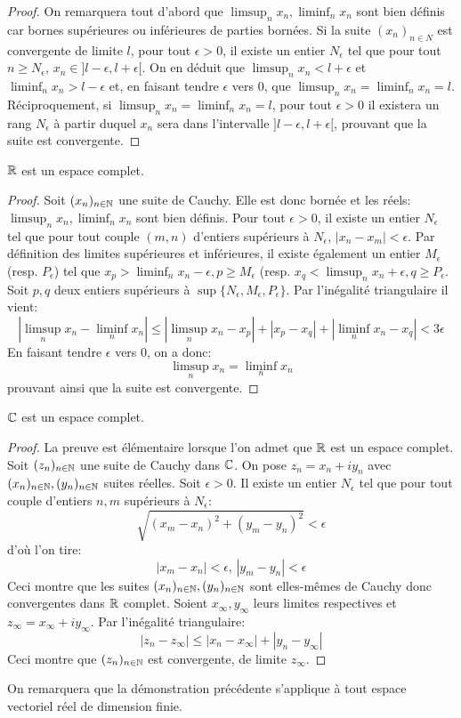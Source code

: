 \begin{proof}
On remarquera tout d'abord que $\limsup_n  x_n, \liminf_n x_n$ sont bien définis car bornes supérieures ou inférieures de parties bornées. Si la suite $(x_n)_{n \in N}$ est convergente de limite $l$, pour tout $\epsilon > 0$, il existe un entier $N_\epsilon$ tel que pour tout $n \geq N_\epsilon$, $x_n \in ]l-\epsilon, l+ \epsilon[$. On en déduit que $\limsup_n x_n < l+ \epsilon$ et $\liminf_n x_n > l- \epsilon$ et, en faisant tendre $\epsilon$ vers 0, que $\limsup_n x_n = \liminf_n x_n= l$. Réciproquement, si $\limsup_n x_n = \liminf_n x_n= l$, pour tout $\epsilon > 0$ il existera un rang $N_\epsilon$ à partir duquel $x_n$ sera dans l'intervalle $]l-\epsilon, l+\epsilon[$, prouvant que la suite est convergente. 
\end{proof}
\begin{fprop}
$\mathbb R$ est un espace complet.
\end{fprop}
\begin{proof}
Soit $(x_n)_{n \in {\mathbb N}}$ une suite de Cauchy. Elle est donc bornée et les réels:  $\limsup_n  x_n, \liminf_n x_n$ sont bien définis. Pour tout $\epsilon > 0$, il existe un entier $N_\epsilon$ tel que pour tout couple $(m,n)$ d'entiers supérieurs à $N_\epsilon$, $|x_n-x_m| < \epsilon$. Par définition des limites supérieures et inférieures, il existe également un entier $M_\epsilon$ (resp. $P_\epsilon$) tel que $x_p > \liminf_n x_n - \epsilon, p \geq M_\epsilon$ (resp. $x_q < \limsup_n x_n +  \epsilon, q \geq P_\epsilon$. Soit $p,q$ deux entiers supérieurs à $\sup \{ N_\epsilon, M_\epsilon, P_\epsilon\}$. Par l'inégalité triangulaire il vient:
\[
\left |\limsup_n x_n - \liminf_n x_n \right | \leq 
\left| \limsup_n x_n - x_p\right | + \left| x_p - x_q\right | + 
\left| \liminf_n x_n - x_q\right |  < 3 \epsilon
\]
En faisant tendre $\epsilon$ vers 0, on a donc:
\[
\limsup_n x_n = \liminf_n x_n 
\]
prouvant ainsi que la suite est convergente. 
\end{proof}
\begin{fprop}
	$\mathbb{C}$ est un espace complet.
\end{fprop}
\begin{proof}
	La preuve est élémentaire lorsque l'on admet que $\mathbb R$ est un espace complet. Soit $(z_n)_{n \in {\mathbb N}}$ une suite de Cauchy dans $\mathbb{C}$. On pose $z_n = x_n + i y_n$ avec $(x_n)_{n \in {\mathbb N}},(y_n)_{n \in {\mathbb N}}$ suites réelles. Soit $\epsilon > 0$. Il existe un entier $N_\epsilon$ tel que pour tout couple d'entiers $n,m$ supérieurs à $N_\epsilon$:
	\[
	\sqrt{(x_m-x_n)^2+(y_m-y_n)^2} < \epsilon
	\]
	d'où l'on tire:
	\[
	|x_m-x_n|<\epsilon, \, |y_m-y_n| < \epsilon
	\]
	Ceci montre que les suites $(x_n)_{n \in {\mathbb N}},(y_n)_{n \in {\mathbb N}}$ sont elles-mêmes de Cauchy donc convergentes dans $\mathbb R$ complet. Soient $x_\infty,y_\infty$ leurs limites respectives et $z_\infty=x_\infty+iy_\infty$. Par l'inégalité triangulaire:
	\[
	|z_n - z_\infty| \leq |x_n - x_\infty|+|y_n-y_\infty|
	\]
	Ceci montre que $(z_n)_{n \in {\mathbb N}}$ est convergente, de limite $z_\infty$.
\end{proof}
\begin{rem}
On remarquera que la démonstration précédente s'applique à tout espace vectoriel réel de dimension finie.
\end{rem}
